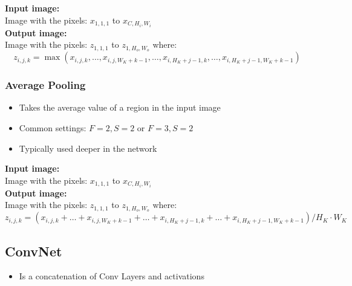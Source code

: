 \documentclass[10pt,a4paper]{article}
\newcommand{\props}{$\circ$}
\newcommand{\iprops}{\item[\props]}
\begin{document}
\textbf{Input image:} \\
Image with the pixels: $x_{1,1,1}$ to $x_{C,H_i,W_i}$ \\

\textbf{Output image:} \\
Image with the pixels: $z_{1,1,1}$ to $z_{1, H_o, W_o}$ where:
$$
	z_{i,j,k} = \max (x_{i,j,k}, \dots, x_{i,j,W_K + k - 1}, \dots, x_{i,H_K + j - 1,k}, \dots, x_{i,H_K + j - 1, W_K + k - 1})
$$

\subsubsection{Average Pooling}
\begin{itemize}
	\item Takes the average value of a region in the input image
	\iprops Common settings: $F = 2, S = 2$ or $F = 3, S = 2$
	\iprops Typically used deeper in the network
\end{itemize}

\textbf{Input image:} \\
Image with the pixels: $x_{1,1,1}$ to $x_{C,H_i,W_i}$ \\

\textbf{Output image:} \\
Image with the pixels: $z_{1,1,1}$ to $z_{1, H_o, W_o}$ where:
$$
	z_{i,j,k} = (x_{i,j,k} + \dots + x_{i,j,W_K + k - 1} + \dots + x_{i,H_K + j - 1,k} + \dots + x_{i,H_K + j - 1, W_K + k - 1}) / H_K ⋅ W_K
$$

\subsection{ConvNet}
\begin{itemize}
	\item Is a concatenation of Conv Layers and activations
\end{itemize}
\end{document}
